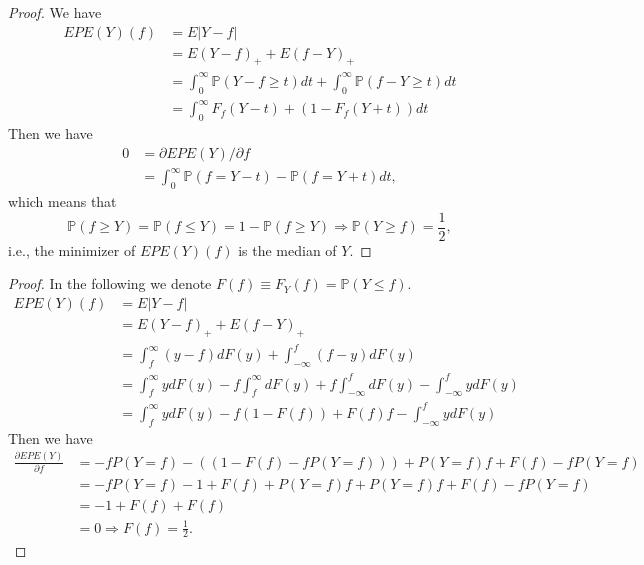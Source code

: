 \documentclass[10pt]{article}
\begin{document}
\begin{proof}
    We have
    \begin{align*}
        EPE(Y)(f)&=E|Y-f|\\
        &=E(Y-f)_{+}+E(f-Y)_{+}\\
        &=\int_{0}^{\infty} \mathbb{P}(Y-f \geq t) d t + \int_{0}^{\infty} \mathbb{P}(f-Y \geq t) d t\\
        &=\int_{0}^{\infty} F_f(Y-t)+(1-F_f(Y+t)) dt
    \end{align*}
    Then we have
    \begin{align*}
       0 &= \partial EPE(Y)/\partial f \\
        &= \int_{0}^{\infty} \mathbb{P}(f=Y-t)-\mathbb{P}(f=Y+t) dt,
    \end{align*}
    which means that
    \[\mathbb{P}(f\geq Y)=\mathbb{P}(f\leq Y)=1-\mathbb{P}(f\geq Y)\Rightarrow \mathbb{P}(Y\geq f)=\frac{1}{2},\]
    i.e., the minimizer of $EPE(Y)(f)$ is the median of $Y$.
\end{proof}
\begin{proof}
    In the following we denote $F(f)\equiv F_Y(f) = \mathbb{P}(Y\leq f)$.
    \begin{align*}
        EPE(Y)(f)&=E|Y-f|\\
        &=E(Y-f)_{+}+E(f-Y)_{+}\\
        &=\int_{f}^{\infty} (y-f) dF(y)+\int_{-\infty}^{f} (f-y) dF(y)\\
        &=\int_{f}^{\infty} y dF(y)-f\int_{f}^{\infty} dF(y)+f\int_{-\infty}^{f} dF(y)-\int_{-\infty}^{f} y dF(y)\\
        &=\int_{f}^{\infty} y dF(y)-f(1-F(f))+F(f)f-\int_{-\infty}^{f} y dF(y)
    \end{align*}
    Then we have
    \begin{align*}
        \frac{\partial EPE(Y)}{\partial f}&= -f P(Y=f)-((1-F(f) - f P(Y=f)))+P(Y=f)f+F(f)-fP(Y=f)\\
        &=-f P(Y=f)-1+F(f)+P(Y=f)f+P(Y=f)f+F(f)-fP(Y=f)\\
        &=-1+F(f)+F(f)\\
        &=0
        \Rightarrow F(f)=\frac{1}{2}.
    \end{align*}
\end{proof}
\end{document}
